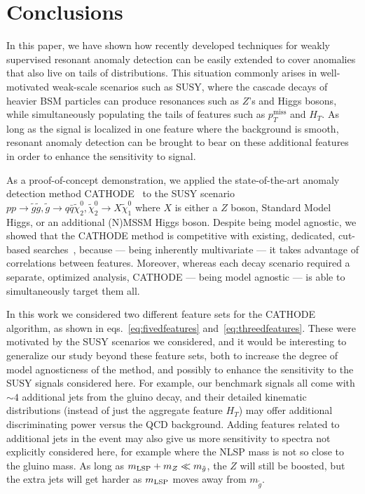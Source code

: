 \documentclass[prd, twocolumn, superscriptaddress,floatfix, nofootinbib, preprintnumbers]{revtex4-2}
\begin{document}
\section{Conclusions}
\label{sec:conclusions}

In this paper, we have shown how recently developed techniques for weakly supervised resonant anomaly detection can be easily extended to cover anomalies that also live on tails of distributions. This situation commonly arises in well-motivated weak-scale scenarios such as SUSY, where the cascade decays of heavier BSM particles can produce resonances such as $Z$'s and Higgs bosons, while simultaneously populating the tails of features such as $p_T^\text{miss}$ and $H_T$. As long as the signal is localized in one feature where the background is smooth, resonant anomaly detection can be brought to bear on these additional features in order to enhance the sensitivity to signal.

As a proof-of-concept demonstration, we applied the state-of-the-art anomaly detection method CATHODE~\cite{Hallin:2021wme} to the SUSY scenario $p p \rightarrow \widetilde{g} \widetilde{g}, \widetilde{g}\rightarrow q \bar{q} \widetilde{\chi}_2^0,\widetilde{\chi}_2^0 \rightarrow X \widetilde{\chi}_1^0$ where $X$ is either a $Z$ boson, Standard Model Higgs, or an additional (N)MSSM Higgs boson. Despite being model agnostic, we showed that the CATHODE method is competitive with existing, dedicated, cut-based searches~\cite{CMS:2020fia,CMS:2022vpy,CMS:2017may}, because --- being inherently multivariate --- it takes advantage of correlations between features. Moreover, whereas each decay scenario required a separate, optimized analysis, CATHODE  --- being model agnostic --- is able to simultaneously target them all. 

In this work we considered two different feature sets for the CATHODE algorithm, as shown in eqs.~\eqref{eq:fivedfeatures} and~\eqref{eq:threedfeatures}. These were motivated by the SUSY scenarios we considered, and it would be interesting to generalize our study beyond these feature sets, both to 
increase the degree of model agnosticness of the method, and possibly to enhance the sensitivity to the SUSY signals considered here. For example, our benchmark signals all come with $\sim 4$ additional jets from the gluino decay, and their detailed kinematic distributions (instead of just the aggregate feature $H_T$) may offer additional discriminating power versus the QCD background. Adding features related to  additional jets in the event may also give us more  sensitivity to spectra not explicitly considered here, for example where the NLSP mass is not so close to the gluino mass. As long as $m_{\rm LSP} + m_Z \ll m_{\tilde g}$, the $Z$ will still be boosted, but the extra jets will get harder as $m_{\rm LSP}$ moves away from $m_{\tilde g}$. %
\end{document}
